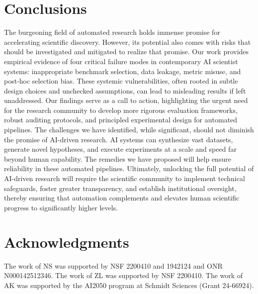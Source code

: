 \documentclass[10pt]{article}
\begin{document}
\section{Conclusions} 

The burgeoning field of automated research holds immense promise for accelerating scientific discovery. However, its potential also comes with risks that should be investigated and mitigated to realize that promise. Our work provides empirical evidence of four critical failure modes in contemporary AI scientist systems: inappropriate benchmark selection, data leakage, metric misuse, and post-hoc selection bias. These systemic vulnerabilities, often rooted in subtle design choices and unchecked assumptions, can lead to misleading results if left unaddressed. Our findings serve as a call to action, highlighting the urgent need for the research community to develop more rigorous evaluation frameworks, robust auditing protocols, and principled experimental design for automated pipelines. The challenges we have identified, while significant, should not diminish the promise of AI-driven research. AI systems can synthesize vast datasets, generate novel hypotheses, and execute experiments at a scale and speed far beyond human capability. The remedies we have proposed will help ensure reliability in these automated pipelines. Ultimately, unlocking the full potential of AI-driven research will require the scientific community to implement technical safeguards, foster greater transparency, and establish institutional oversight, thereby ensuring that automation complements and elevates human scientific progress to significantly higher levels.


\section*{Acknowledgments}
The work of NS was supported by NSF  2200410 and 1942124 and ONR N000142512346. The work of ZL was supported by NSF 2200410. The work of AK was supported by the AI2050 program at Schmidt Sciences (Grant 24-66924).







\appendix

~\\~\\
\end{document}
